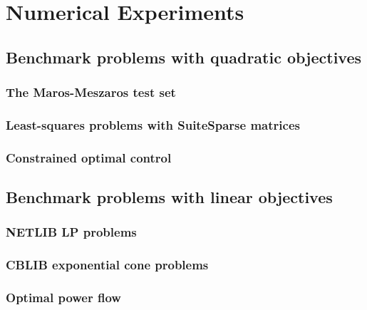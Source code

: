 \documentclass[11pt,a4paper]{article}
\begin{document}
\section{Numerical Experiments}

\subsection{Benchmark problems with quadratic objectives}

    \subsubsection{The Maros-Meszaros test set}

    \subsubsection{Least-squares problems with SuiteSparse matrices}

    \pagebreak
    \subsubsection{Constrained optimal control}


\pagebreak
\subsection{Benchmark problems with linear objectives}

    \subsubsection{NETLIB LP problems}

    \pagebreak
    \subsubsection{CBLIB exponential cone problems}

    \pagebreak
    \subsubsection{Optimal power flow}
\end{document}
